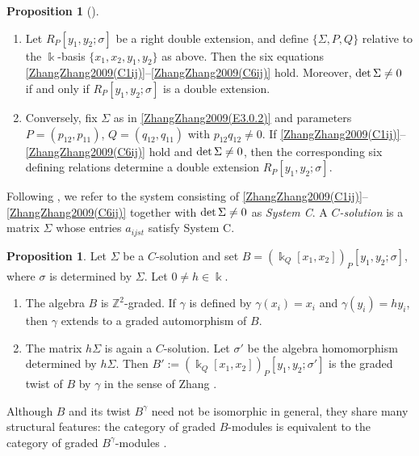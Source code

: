 \documentclass{amsart}
\theoremstyle{definition}
\newtheorem{proposition}[theorem]{Proposition}
\theoremstyle{remark}
\numberwithin{equation}{section}
\begin{document}
\begin{proposition}[{\cite[Proposition 3.1]{ZhangZhang2009}}]
\begin{enumerate}
    \item[\rm (1)] Let $R_P[y_1,y_2;\sigma]$ be a right double extension, and define $\{\Sigma,P,Q\}$ relative to the $\Bbbk$-basis $\{x_1,x_2,y_1,y_2\}$ as above. Then the six equations \eqref{ZhangZhang2009(C1ij)}--\eqref{ZhangZhang2009(C6ij)} hold. Moreover, ${\rm det}\,\Sigma\neq 0$ if and only if $R_P[y_1,y_2;\sigma]$ is a double extension.
    \item[\rm (2)] Conversely, fix $\Sigma$ as in \eqref{ZhangZhang2009(E3.0.2)} and parameters $P=(p_{12},p_{11})$, $Q=(q_{12},q_{11})$ with $p_{12}q_{12}\neq 0$. If \eqref{ZhangZhang2009(C1ij)}--\eqref{ZhangZhang2009(C6ij)} hold and ${\rm det}\,\Sigma\neq 0$, then the corresponding six defining relations determine a double extension $R_P[y_1,y_2;\sigma]$.
\end{enumerate}
\end{proposition}

Following \cite{ZhangZhang2009}, we refer to the system consisting of \eqref{ZhangZhang2009(C1ij)}--\eqref{ZhangZhang2009(C6ij)} together with ${\rm det}\,\Sigma\neq 0$ as \emph{System C}. A \emph{$C$-solution} is a matrix $\Sigma$ whose entries $a_{ijst}$ satisfy System C.

\begin{proposition}
Let $\Sigma$ be a $C$-solution and set $B=(\Bbbk_Q[x_1,x_2])_P[y_1,y_2;\sigma]$, where $\sigma$ is determined by $\Sigma$. Let $0\neq h\in\Bbbk$.
\begin{enumerate}
    \item[\rm (1)] The algebra $B$ is $\mathbb{Z}^2$-graded. If $\gamma$ is defined by $\gamma(x_i)=x_i$ and $\gamma(y_i)=hy_i$, then $\gamma$ extends to a graded automorphism of $B$.
    \item[\rm (2)] The matrix $h\Sigma$ is again a $C$-solution. Let $\sigma'$ be the algebra homomorphism determined by $h\Sigma$. Then
    $B':=(\Bbbk_Q[x_1,x_2])_P[y_1,y_2;\sigma']$
    is the graded twist of $B$ by $\gamma$ in the sense of Zhang \cite{Zhang1996}.
\end{enumerate}
\end{proposition}

Although $B$ and its twist $B^{\gamma}$ need not be isomorphic in general, they share many structural features: the category of graded $B$-modules is equivalent to the category of graded $B^{\gamma}$-modules \cite[Theorem 1.1]{Zhang1996}.
\end{document}
